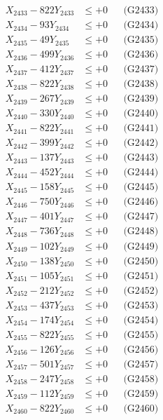\documentclass[a4paper,10pt]{article}
\begin{document}
{\begin{align}
X_{2433} - 822Y_{2433} &\leq +0 && \text{(G2433)} \\
X_{2434} - 93Y_{2434} &\leq +0 && \text{(G2434)} \\
X_{2435} - 49Y_{2435} &\leq +0 && \text{(G2435)} \\
X_{2436} - 499Y_{2436} &\leq +0 && \text{(G2436)} \\
X_{2437} - 412Y_{2437} &\leq +0 && \text{(G2437)} \\
X_{2438} - 822Y_{2438} &\leq +0 && \text{(G2438)} \\
X_{2439} - 267Y_{2439} &\leq +0 && \text{(G2439)} \\
X_{2440} - 330Y_{2440} &\leq +0 && \text{(G2440)} \\
\allowbreak
X_{2441} - 822Y_{2441} &\leq +0 && \text{(G2441)} \\
X_{2442} - 399Y_{2442} &\leq +0 && \text{(G2442)} \\
X_{2443} - 137Y_{2443} &\leq +0 && \text{(G2443)} \\
X_{2444} - 452Y_{2444} &\leq +0 && \text{(G2444)} \\
X_{2445} - 158Y_{2445} &\leq +0 && \text{(G2445)} \\
X_{2446} - 750Y_{2446} &\leq +0 && \text{(G2446)} \\
X_{2447} - 401Y_{2447} &\leq +0 && \text{(G2447)} \\
X_{2448} - 736Y_{2448} &\leq +0 && \text{(G2448)} \\
X_{2449} - 102Y_{2449} &\leq +0 && \text{(G2449)} \\
X_{2450} - 138Y_{2450} &\leq +0 && \text{(G2450)} \\
\allowbreak
X_{2451} - 105Y_{2451} &\leq +0 && \text{(G2451)} \\
X_{2452} - 212Y_{2452} &\leq +0 && \text{(G2452)} \\
X_{2453} - 437Y_{2453} &\leq +0 && \text{(G2453)} \\
X_{2454} - 174Y_{2454} &\leq +0 && \text{(G2454)} \\
X_{2455} - 822Y_{2455} &\leq +0 && \text{(G2455)} \\
X_{2456} - 126Y_{2456} &\leq +0 && \text{(G2456)} \\
X_{2457} - 501Y_{2457} &\leq +0 && \text{(G2457)} \\
X_{2458} - 247Y_{2458} &\leq +0 && \text{(G2458)} \\
X_{2459} - 112Y_{2459} &\leq +0 && \text{(G2459)} \\
X_{2460} - 822Y_{2460} &\leq +0 && \text{(G2460)} \\

\end{align}}
\end{document}
